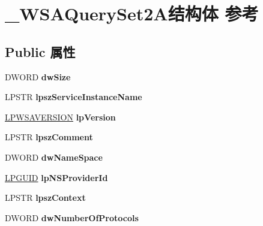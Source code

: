 \hypertarget{struct___w_s_a_query_set2_a}{}\section{\+\_\+\+W\+S\+A\+Query\+Set2\+A结构体 参考}
\label{struct___w_s_a_query_set2_a}
\subsection*{Public 属性}
\begin{DoxyCompactItemize}
\item 
\mbox{\label{struct___w_s_a_query_set2_a_ae42d926321ddf0243b2d0324d1fcf4a6}} 
D\+W\+O\+RD {\bfseries dw\+Size}
\item 
\mbox{\label{struct___w_s_a_query_set2_a_a49837951dcae8600a1a3c982e43f4047}} 
L\+P\+S\+TR {\bfseries lpsz\+Service\+Instance\+Name}
\item 
\mbox{\label{struct___w_s_a_query_set2_a_a834da837c230837f2ec96de611bf4ae0}} 
\hyperlink{struct___w_s_a_version}{L\+P\+W\+S\+A\+V\+E\+R\+S\+I\+ON} {\bfseries lp\+Version}
\item 
\mbox{\label{struct___w_s_a_query_set2_a_a71ae1618d572302d09b23962856e0c0f}} 
L\+P\+S\+TR {\bfseries lpsz\+Comment}
\item 
\mbox{\label{struct___w_s_a_query_set2_a_ade6deb6f0cee2cfc0696ca2000f8af59}} 
D\+W\+O\+RD {\bfseries dw\+Name\+Space}
\item 
\mbox{\label{struct___w_s_a_query_set2_a_a1b80fc0e4bec9de7e1da474889fca98e}} 
\hyperlink{interface_g_u_i_d}{L\+P\+G\+U\+ID} {\bfseries lp\+N\+S\+Provider\+Id}
\item 
\mbox{\label{struct___w_s_a_query_set2_a_a687029e85f2740718405d5c3c02ce78f}} 
L\+P\+S\+TR {\bfseries lpsz\+Context}
\item 
\mbox{\label{struct___w_s_a_query_set2_a_a1a15c3e06a3f5cdd4dcfeb2170a408b6}} 
D\+W\+O\+RD {\bfseries dw\+Number\+Of\+Protocols}

\end{DoxyCompactItemize}
